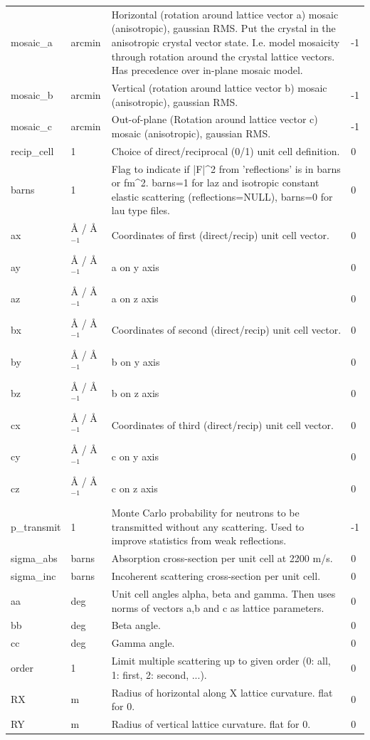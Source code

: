 \begin{longtable}{p{}p{}p{}p{}}
mosaic\_a & arcmin & Horizontal (rotation around lattice vector a) mosaic (anisotropic), gaussian RMS. Put the crystal in the anisotropic crystal vector state. I.e. model mosaicity through rotation around the crystal lattice vectors. Has precedence over in-plane mosaic model. & -1 \\
mosaic\_b & arcmin & Vertical (rotation around lattice vector b) mosaic (anisotropic), gaussian RMS. & -1 \\
mosaic\_c & arcmin & Out-of-plane (Rotation around lattice vector c) mosaic (anisotropic), gaussian RMS. & -1 \\
recip\_cell & 1 & Choice of direct/reciprocal (0/1) unit cell definition. & 0 \\
barns & 1 & Flag to indicate if |F|\textasciicircum{}2 from 'reflections' is in barns or fm\textasciicircum{}2. barns=1 for laz and isotropic constant elastic scattering (reflections=NULL), barns=0 for lau type files. & 0 \\
ax & \AA{} / \AA{}$^{-1}$ & Coordinates of first (direct/recip) unit cell vector. & 0 \\
ay & \AA{} / \AA{}$^{-1}$ & a on y axis & 0 \\
az & \AA{} / \AA{}$^{-1}$ & a on z axis & 0 \\
bx & \AA{} / \AA{}$^{-1}$ & Coordinates of second (direct/recip) unit cell vector. & 0 \\
by & \AA{} / \AA{}$^{-1}$ & b on y axis & 0 \\
bz & \AA{} / \AA{}$^{-1}$ & b on z axis & 0 \\
cx & \AA{} / \AA{}$^{-1}$ & Coordinates of third (direct/recip) unit cell vector. & 0 \\
cy & \AA{} / \AA{}$^{-1}$ & c on y axis & 0 \\
cz & \AA{} / \AA{}$^{-1}$ & c on z axis & 0 \\
p\_transmit & 1 & Monte Carlo probability for neutrons to be transmitted without any scattering. Used to improve statistics from weak reflections. & -1 \\
sigma\_abs & barns & Absorption cross-section per unit cell at 2200 m/s. & 0 \\
sigma\_inc & barns & Incoherent scattering cross-section per unit cell. & 0 \\
aa & deg & Unit cell angles alpha, beta and gamma. Then uses norms of vectors a,b and c as lattice parameters. & 0 \\
bb & deg & Beta angle. & 0 \\
cc & deg & Gamma angle. & 0 \\
order & 1 & Limit multiple scattering up to given order (0: all, 1: first, 2: second, ...). & 0 \\
RX & m & Radius of horizontal along X lattice curvature. flat for 0. & 0 \\
RY & m & Radius of vertical lattice curvature. flat for 0. & 0 \\
\bottomrule
\end{longtable}

